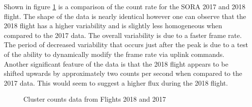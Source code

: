Shown in figure \ref{counts} is a comparison of the count rate for the SORA 2017 and 2018 flight. The shape of the data is nearly identical however one can observe that the 2018 flight has a higher variability and is slightly less homogeneous when compared to the 2017 data. The overall variability is due to a faster frame rate. The period of decreased variability that occurs just after the peak is due to a test of the ability to dynamically modify the frame rate via uplink commands. Another significant feature of the data is that the 2018 flight appears to be shifted upwards by approximately two counts per second when compared to the 2017 data. This would seem to suggest a higher flux during the 2018 flight.
\begin{figure}[H]
\hfill
{}
\hfill
{}
\hfill
\caption{Cluster counts data from Flights 2018 and 2017}
\label{counts}
\end{figure}

